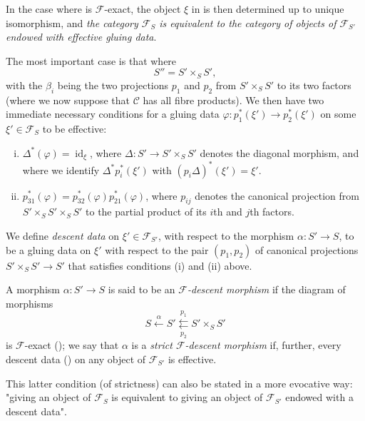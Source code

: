 In the case where  is $\mathcal{F}$-exact, the object $\xi$ in  is then determined up to unique isomorphism, and \emph{the category $\mathcal{F}_S$ is equivalent to the category of objects of $\mathcal{F}_{S'}$ endowed with effective gluing data}.

\label{fga3.i-a.1.c}
The most important case is that where
\[
    S'' = S' \times_S S',
\]
with the $\beta_i$ being the two projections $p_1$ and $p_2$ from $S'\times_S S'$ to its two factors (where we now suppose that $\mathcal{C}$ has all fibre products).
We then have two immediate necessary conditions for a gluing data $\varphi\colon p_1^*(\xi')\to p_2^*(\xi')$ on some $\xi'\in\mathcal{F}_S$ to be effective:

\begin{enumerate}[i.]
    \item $\Delta^*(\varphi) = \operatorname{id}_\xi$, where $\Delta\colon S'\to S'\times_S S'$ denotes the diagonal morphism, and where we identify $\Delta^* p_i^*(\xi')$ with $(p_i\Delta)^*(\xi')=\xi'$.
    \item $p_{31}^*(\varphi) = p_{32}^*(\varphi)p_{21}^*(\varphi)$, where $p_{ij}$ denotes the canonical projection from $S'\times_S S'\times_S S'$ to the partial product of its $i$th and $j$th factors.
\end{enumerate}

\begin{definition}\label{fga3.i-a.1-definition-1.6}
    We define \emph{descent data} on $\xi'\in\mathcal{F}_{S'}$, with respect to the morphism $\alpha\colon S'\to S$, to be a gluing data on $\xi'$ with respect to the pair $(p_1,p_2)$ of canonical projections $S'\times_S S'\to S'$ that satisfies conditions (i) and (ii) above.
\end{definition}

\begin{definition}\label{fga3.i-a.1-definition-1.7}
    A morphism $\alpha\colon S'\to S$ is said to be an \emph{$\mathcal{F}$-descent morphism} if the diagram of morphisms
    \[
        S \xleftarrow{\alpha}
        S' \overset{p_1}{\underset{p_2}{\leftleftarrows}}
        S'\times_S S'
    \]
    is $\mathcal{F}$-exact ();
    we say that $\alpha$ is a \emph{strict $\mathcal{F}$-descent morphism} if, further, every descent data () on any object of $\mathcal{F}_{S'}$ is effective.

    This latter condition (of strictness) can also be stated in a more evocative way:
    "giving an object of $\mathcal{F}_S$ is equivalent to giving an object of $\mathcal{F}_{S'}$ endowed with a descent data".
\end{definition}


